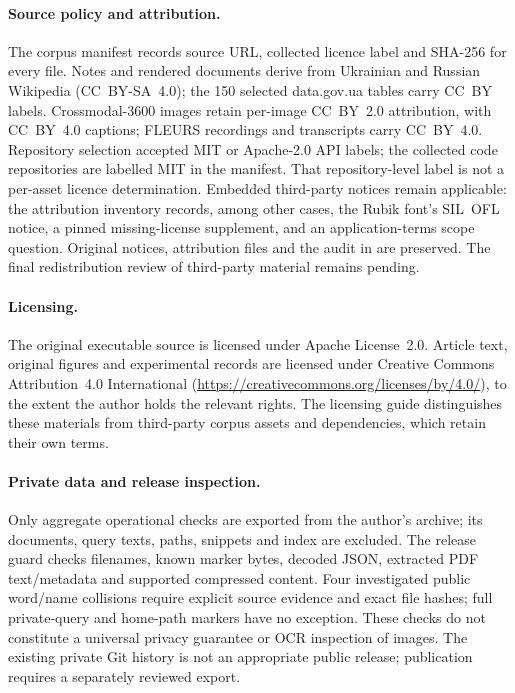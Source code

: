 \paragraph{Source policy and attribution.}
The corpus manifest records source URL, collected licence label and SHA-256 for every file. Notes and rendered documents derive from Ukrainian and Russian Wikipedia (CC~BY-SA~4.0); the 150 selected data.gov.ua tables carry CC~BY labels. Crossmodal-3600 images retain per-image CC~BY~2.0 attribution, with CC~BY~4.0 captions; FLEURS recordings and transcripts carry CC~BY~4.0. Repository selection accepted MIT or Apache-2.0 API labels; the collected code repositories are labelled MIT in the manifest. That repository-level label is not a per-asset licence determination. Embedded third-party notices remain applicable: the attribution inventory records, among other cases, the Rubik font's SIL~OFL notice, a pinned missing-license supplement, and an application-terms scope question. Original notices, attribution files and the audit in  are preserved. The final redistribution review of third-party material remains pending.

\paragraph{Licensing.}
The original executable source is licensed under Apache License~2.0. Article text, original figures and experimental records are licensed under Creative Commons Attribution~4.0 International (\url{https://creativecommons.org/licenses/by/4.0/}), to the extent the author holds the relevant rights. The licensing guide distinguishes these materials from third-party corpus assets and dependencies, which retain their own terms.

\paragraph{Private data and release inspection.}
Only aggregate operational checks are exported from the author's archive; its documents, query texts, paths, snippets and index are excluded. The release guard checks filenames, known marker bytes, decoded JSON, extracted PDF text/metadata and supported compressed content. Four investigated public word/name collisions require explicit source evidence and exact file hashes; full private-query and home-path markers have no exception. These checks do not constitute a universal privacy guarantee or OCR inspection of images. The existing private Git history is not an appropriate public release; publication requires a separately reviewed export.

